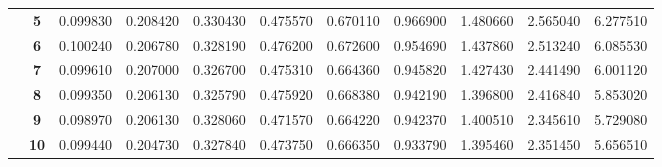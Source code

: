 \begin{table}[h]
{\begin{tabular}{ccccccccccc}
\multicolumn{1}{c|}{} & \multicolumn{1}{c|}{\textbf{5}} & \multicolumn{1}{c|}{0.099830} & \multicolumn{1}{c|}{0.208420} & \multicolumn{1}{c|}{0.330430} & \multicolumn{1}{c|}{0.475570} & \multicolumn{1}{c|}{0.670110} & \multicolumn{1}{c|}{0.966900} & \multicolumn{1}{c|}{1.480660} & \multicolumn{1}{c|}{2.565040} & \multicolumn{1}{c|}{6.277510} \\ \cline{2-11}
\multicolumn{1}{c|}{} & \multicolumn{1}{c|}{\textbf{6}} & \multicolumn{1}{c|}{0.100240} & \multicolumn{1}{c|}{0.206780} & \multicolumn{1}{c|}{0.328190} & \multicolumn{1}{c|}{0.476200} & \multicolumn{1}{c|}{0.672600} & \multicolumn{1}{c|}{0.954690} & \multicolumn{1}{c|}{1.437860} & \multicolumn{1}{c|}{2.513240} & \multicolumn{1}{c|}{6.085530} \\ \cline{2-11}
\multicolumn{1}{c|}{} & \multicolumn{1}{c|}{\textbf{7}} & \multicolumn{1}{c|}{0.099610} & \multicolumn{1}{c|}{0.207000} & \multicolumn{1}{c|}{0.326700} & \multicolumn{1}{c|}{0.475310} & \multicolumn{1}{c|}{0.664360} & \multicolumn{1}{c|}{0.945820} & \multicolumn{1}{c|}{1.427430} & \multicolumn{1}{c|}{2.441490} & \multicolumn{1}{c|}{6.001120} \\ \cline{2-11}
\multicolumn{1}{c|}{} & \multicolumn{1}{c|}{\textbf{8}} & \multicolumn{1}{c|}{0.099350} & \multicolumn{1}{c|}{0.206130} & \multicolumn{1}{c|}{0.325790} & \multicolumn{1}{c|}{0.475920} & \multicolumn{1}{c|}{0.668380} & \multicolumn{1}{c|}{0.942190} & \multicolumn{1}{c|}{1.396800} & \multicolumn{1}{c|}{2.416840} & \multicolumn{1}{c|}{5.853020} \\ \cline{2-11}
\multicolumn{1}{c|}{} & \multicolumn{1}{c|}{\textbf{9}} & \multicolumn{1}{c|}{0.098970} & \multicolumn{1}{c|}{0.206130} & \multicolumn{1}{c|}{0.328060} & \multicolumn{1}{c|}{0.471570} & \multicolumn{1}{c|}{0.664220} & \multicolumn{1}{c|}{0.942370} & \multicolumn{1}{c|}{1.400510} & \multicolumn{1}{c|}{2.345610} & \multicolumn{1}{c|}{5.729080} \\ \cline{2-11}
\multicolumn{1}{c|}{} & \multicolumn{1}{c|}{\textbf{10}} & \multicolumn{1}{c|}{0.099440} & \multicolumn{1}{c|}{0.204730} & \multicolumn{1}{c|}{0.327840} & \multicolumn{1}{c|}{0.473750} & \multicolumn{1}{c|}{0.666350} & \multicolumn{1}{c|}{0.933790} & \multicolumn{1}{c|}{1.395460} & \multicolumn{1}{c|}{2.351450} & \multicolumn{1}{c|}{5.656510} \\ \cline{2-11}
\end{tabular}%
}
\end{table}

